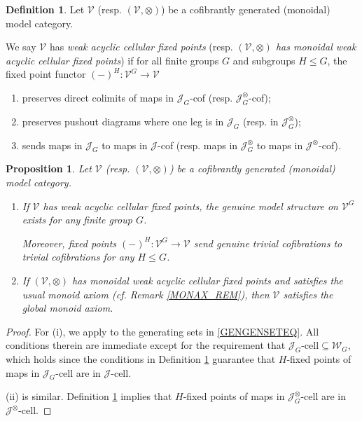 \documentclass[a4paper,10pt
,draft
]{article}%
\numberwithin{equation}{section}
\numberwithin{figure}{section}
\newtheorem{proposition}[equation]{Proposition}%
\theoremstyle{definition} %
\newtheorem{definition}[equation]{Definition}%
\newcommand{\Set}{\ensuremath{\mathsf{Set}}}
\newcommand{\V}{\ensuremath{\mathcal V}}
\newcommand{\1}{\ensuremath{\mathbbm 1}}%
\begin{document}
\begin{definition}\label{WEAKCELL DEF}
Let $\V$ (resp. $(\V,\otimes)$)
be a cofibrantly generated (monoidal) model category.

	We say $\V$ has \textit{weak acyclic cellular fixed points}
	(resp. \textit{$(\V,\otimes)$ has monoidal weak acyclic cellular fixed points}) if
	for all finite groups $G$ and subgroups $H \leq G$,
	the fixed point functor $(-)^H \colon \V^G \to \V$
\begin{enumerate}[label = (\roman*)]
	\item preserves direct colimits of maps in $\mathcal J_G$-cof (resp. $\mathcal {J}^{\otimes}_G$-cof);
	\item preserves pushout diagrams 
	where one leg is in $\mathcal J_G$ 
	(resp. in $\mathcal {J}^{\otimes}_G$);
	\item sends maps in $\mathcal J_G$ to maps in $\mathcal J$-cof (resp. maps in $\mathcal {J}^{\otimes}_G$ to maps in 
	$\mathcal{J}^{\otimes}$-cof).
\end{enumerate}
\end{definition}


\begin{proposition}\label{WEAKCELL PROP}
	Let $\V$ (resp. $(\V,\otimes)$) be a cofibrantly generated (monoidal) model category.
	\begin{enumerate}[label=(\roman*)]
		\item If $\V$ has weak acyclic cellular fixed points, 
		the genuine model structure on $\V^G$
		exists for any finite group $G$.
		
		Moreover, fixed points $(-)^H \colon \V^G \to \V$
		send genuine trivial cofibrations to trivial cofibrations for any $H\leq G$.
		\item If $(\V,\otimes)$ has monoidal weak acyclic cellular fixed points and satisfies the usual monoid axiom
		(cf. Remark \ref{MONAX_REM}),
		then $\V$ satisfies the global monoid axiom.
	\end{enumerate}
\end{proposition}

\begin{proof}
For (i), we apply \cite[Theorem 2.1.19]{Hov99} to the generating sets in 
\eqref{GENGENSETEQ}.
All conditions therein are immediate 
except for the requirement that
$\mathcal{J}_{G}\text{-cell} \subseteq \mathcal{W}_G$,
which holds since the conditions in Definition \ref{WEAKCELL DEF}
guarantee that $H$-fixed points of maps in 
$\mathcal{J}_{G}$-cell are in $\mathcal{J}$-cell.

(ii) is similar. Definition \ref{WEAKCELL DEF}
implies that $H$-fixed points of maps in 
$\mathcal{J}^{\otimes}_{G}$-cell are in $\mathcal{J}^{\otimes}$-cell.
\end{proof}
\end{document}
